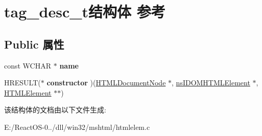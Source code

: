 \hypertarget{structtag__desc__t}{}\section{tag\+\_\+desc\+\_\+t结构体 参考}
\label{structtag__desc__t}
\subsection*{Public 属性}
\begin{DoxyCompactItemize}
\item 
\mbox{\label{structtag__desc__t_a0d432c8ffbc2ad0ff7fa30b042e70b50}} 
const W\+C\+H\+AR $\ast$ {\bfseries name}
\item 
\mbox{\label{structtag__desc__t_a158d0255d8870ec481c8ac36042da58b}} 
H\+R\+E\+S\+U\+LT($\ast$ {\bfseries constructor} )(\hyperlink{struct_h_t_m_l_document_node}{H\+T\+M\+L\+Document\+Node} $\ast$, \hyperlink{interfacens_i_d_o_m_h_t_m_l_element}{ns\+I\+D\+O\+M\+H\+T\+M\+L\+Element} $\ast$, \hyperlink{struct_h_t_m_l_element}{H\+T\+M\+L\+Element} $\ast$$\ast$)
\end{DoxyCompactItemize}


该结构体的文档由以下文件生成\+:\begin{DoxyCompactItemize}
\item 
E\+:/\+React\+O\+S-\/0../dll/win32/mshtml/htmlelem.\+c\end{DoxyCompactItemize}
